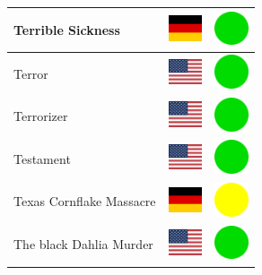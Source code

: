 \documentclass[12pt, a4paper, twoside]{report}
\begin{document}
\begin{center}
\begin{longtable}{|p{5cm}|p{2cm}|p{2cm}|}
 Terrible Sickness                                          & \includegraphics[width=1cm]{../img/flags/de} &   \includegraphics[width=1cm]{../likes/y} \\ \hline
 Terror                                                     & \includegraphics[width=1cm]{../img/flags/us} &   \includegraphics[width=1cm]{../likes/y} \\ \hline
 Terrorizer                                                 & \includegraphics[width=1cm]{../img/flags/us} &   \includegraphics[width=1cm]{../likes/y} \\ \hline
 Testament                                                  & \includegraphics[width=1cm]{../img/flags/us} &   \includegraphics[width=1cm]{../likes/y} \\ \hline
 Texas Cornflake Massacre                                   & \includegraphics[width=1cm]{../img/flags/de} &   \includegraphics[width=1cm]{../likes/m} \\ \hline
 The black Dahlia Murder                                    & \includegraphics[width=1cm]{../img/flags/us} &   \includegraphics[width=1cm]{../likes/y} \\ \hline

\end{longtable}
\end{center}
\end{document}
